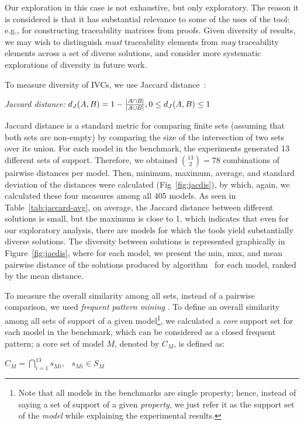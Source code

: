 Our exploration in this case is not exhaustive, but only exploratory.  The reason it is considered is that it has substantial relevance to some of the uses of the tool: e.g., for constructing traceability matrices from proofs.  Given diversity of results, we may wish to distinguish {\em must} traceability elements from {\em may} traceability elements across a set of diverse solutions, and consider more systematic explorations of diversity in future work.

To measure diversity of IVCs, we use Jaccard distance~:
\begin{definition}{\emph{Jaccard distance:}}
  \label{def:dj}
  $d_J(\small{A}, \small{B}) = 1 - \frac{|A \cap B|}{|A \cup B|} ,\\ 0 \leq d_J(\small{A}, \small{B}) \leq 1$
\end{definition}
\noindent Jaccard distance is a standard metric for comparing finite sets (assuming that both sets are non-empty) by comparing the size of the intersection of two sets over its union.  For each model in the benchmark, the experiments generated 13 different sets of support. Therefore, we obtained $\binom{13}{2} = 78$ combinations of pairwise distances per model. Then, minimum, maximum, average, and standard deviation of the distances were calculated (Fig~\ref{fig:jacdis}), by which, again, we calculated these four measures among all 405 models.  As seen in Table~\ref{tab:jaccard-avg}, on average, the Jaccard distance between different solutions is small, but the maximum is close to 1, which indicates that even for our exploratory analysis, there are models for which the tools yield substantially diverse solutions.  The diversity between solutions is represented graphically in Figure~\ref{fig:jacdis}, where for each model, we present the min, max, and mean pairwise distance of the solutions produced by algorithm \ucalg\ for each model, ranked by the mean distance.



To measure the overall similarity among all sets, instead of a pairwise comparison, we used \emph{frequent pattern mining} \cite{han2007frequent}. To define an overall similarity among all sets of support of a given model\footnote{Note that all models in the benchmarks are single property; hence, instead of saying a set of support of a given \emph{property}, we just refer it as the support set of the \emph{model} while explaining the experimental results.}, we calculated a \emph{core} support set for each model in the benchmark, which can be considered as a closed frequent pattern; a core set of model $M$, denoted by $C_M$, is defined as:
\begin{definition}
  \label{def:core}
  $C_M = \bigcap_{i=1}^{13} s_{Mi},   \hspace{9pt} s_{Mi} \in S_M$
\end{definition}


